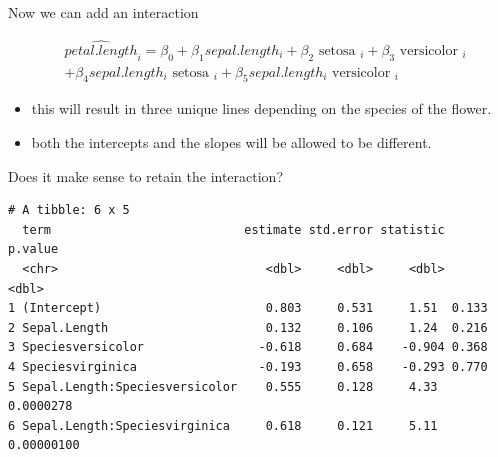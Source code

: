\documentclass[australian,ignorenonframetext,aspectratio=169]{beamer}
\providecommand{\tightlist}{%
  \setlength{\itemsep}{0pt}\setlength{\parskip}{0pt}}
\begin{document}
\begin{frame}[fragile]{Now we can add an interaction}
\protect\hypertarget{now-we-can-add-an-interaction}{}

\tiny

\[
\begin{aligned}
&\widehat{petal.length}_i = \beta_0 + \beta_1 sepal.length_i + \beta_2 \text { setosa }_i + \beta_3 \text { versicolor }_i \\
&+ \beta_4 sepal.length_i \text { setosa }_i + \beta_5 sepal.length_i \text { versicolor }_i
\end{aligned}
\]

\begin{itemize}
\tightlist
\item
  this will result in three unique lines depending on the species of the
  flower.
\item
  both the intercepts and the slopes will be allowed to be different.
\end{itemize}

\begin{block}{Does it make sense to retain the interaction?}

\tiny

\begin{verbatim}
# A tibble: 6 x 5
  term                           estimate std.error statistic    p.value
  <chr>                             <dbl>     <dbl>     <dbl>      <dbl>
1 (Intercept)                       0.803     0.531     1.51  0.133     
2 Sepal.Length                      0.132     0.106     1.24  0.216     
3 Speciesversicolor                -0.618     0.684    -0.904 0.368     
4 Speciesvirginica                 -0.193     0.658    -0.293 0.770     
5 Sepal.Length:Speciesversicolor    0.555     0.128     4.33  0.0000278 
6 Sepal.Length:Speciesvirginica     0.618     0.121     5.11  0.00000100
\end{verbatim}

\end{block}

\end{frame}
\end{document}
